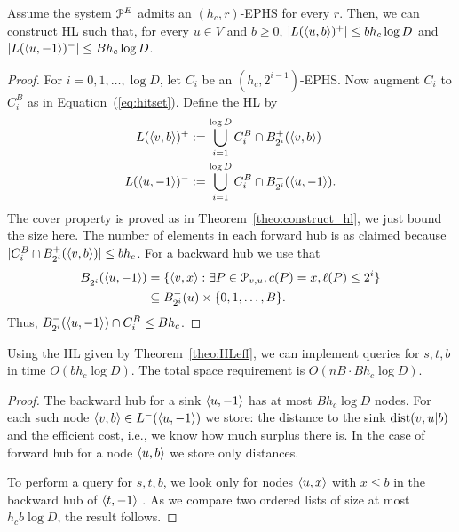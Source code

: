 \begin{theorem}\label{theo:HLeff}
Assume the system $\mathcal{P}^E$ admits an $(h_c,r)$-EPHS for every $r$.
Then, we can construct HL such that, for every $u\in V$ and $b\geq 0$, $\lvert L(\langle u,b\rangle)^+\rvert\leq bh_c\log D$ and $\lvert L(\langle u,-1\rangle)^-\rvert\leq Bh_c\log D$. 
\end{theorem}
\begin{proof}
For $i=0,1,\ldots,\log D$, let $C_i$ be an $(h_c,2^{i-1})$-EPHS.
Now augment $C_i$ to $C_i^B$ as in Equation~(\ref{eq:hitset}).
Define the HL by
\begin{align*}
L(\langle v,b\rangle)^+ &:= \bigcup_{i=1}^{\log D} C_i^B\cap B^+_{2^i}(\langle v,b\rangle)\\
L(\langle u,-1\rangle)^-  &:= \bigcup_{i=1}^{\log D} C_i^B\cap B^-_{2^i}(\langle u,-1\rangle).
\end{align*}
The cover property is proved as in Theorem~\ref{theo:construct_hl}, we just bound the size here.
The number of elements in each forward hub is as claimed because $ \lvert C_i^B\cap B^+_{2^i}(\langle v,b\rangle)\rvert\leq bh_c$.
For a backward hub we use that
\begin{align*}
B^-_{2^i}(\langle u,-1\rangle) &= \{\langle v,x\rangle: \exists P\in \mathcal{P}_{v,u}, c(P)=x, \ell(P)\leq 2^i\}\\
&\subseteq B^-_{2^i}(u)\times \{0,1,\ldots,B\}.
\end{align*}
Thus, $B^-_{2^i}(\langle u,-1\rangle)\cap C_i^B\leq Bh_c$.
\end{proof}


\begin{proposition}
Using the HL given by Theorem~\ref{theo:HLeff}, we can implement queries for $s,t,b$ in time $O(b h_c\log D)$.
The total space requirement is $O(nB \cdot Bh_c\log D)$.
\end{proposition}
\begin{proof}
The backward hub for a sink $\langle u,-1\rangle$ has at most $Bh_c\log D$ nodes.
For each such node $\langle v,b\rangle\in L^-(\langle u,-1\rangle)$ we store: the distance to the sink $\text{dist}(v,u|b)$ and the efficient cost, i.e., we know how much surplus there is.
In the case of forward hub for a node $\langle u,b\rangle$ we store only distances.

To perform a query for $s,t,b$, we look only for nodes $\langle u,x\rangle$ with $x\leq b$ in the backward hub of $\langle t,-1\rangle$ .
As we compare two ordered lists of size at most $h_cb\log D$, the result follows.
\end{proof}
